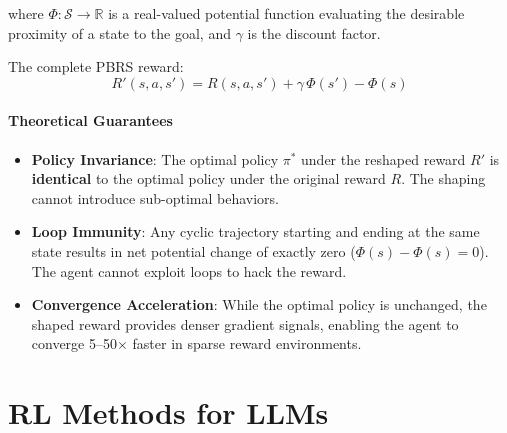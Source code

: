 where $\Phi: \mathcal{S} \to \mathbb{R}$ is a real-valued potential function evaluating the desirable proximity of a state to the goal, and $\gamma$ is the discount factor.

The complete PBRS reward: 
\begin{equation}
R'(s, a, s') = R(s, a, s') + \gamma\, \Phi(s') - \Phi(s)
\end{equation}

\subsection{Theoretical Guarantees}
\label{theoretical-guarantees}

\begin{keybox}
\begin{itemize}
  \item \textbf{Policy Invariance}: The optimal policy $\pi^*$ under the reshaped reward $R'$ is \textbf{identical} to the optimal policy under the original reward $R$. The shaping cannot introduce sub-optimal behaviors.
  \item \textbf{Loop Immunity}: Any cyclic trajectory starting and ending at the same state results in net potential change of exactly zero ($\Phi(s) - \Phi(s) = 0$). The agent cannot exploit loops to hack the reward.
  \item \textbf{Convergence Acceleration}: While the optimal policy is unchanged, the shaped reward provides denser gradient signals, enabling the agent to converge 5--50$\times$ faster in sparse reward environments.
\end{itemize}
\end{keybox}

\part{RL Methods for LLMs}

